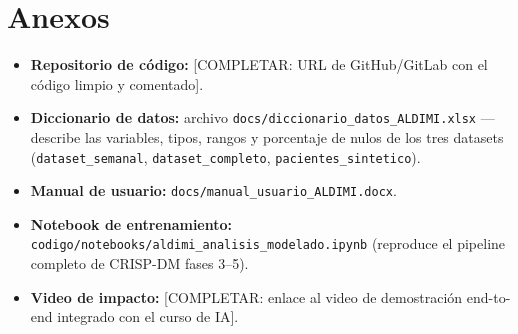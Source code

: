 \section*{Anexos}

\begin{itemize}[leftmargin=1.6em]
  \item \textbf{Repositorio de código:}
        [COMPLETAR: URL de GitHub/GitLab con el código limpio y comentado].
  \item \textbf{Diccionario de datos:} archivo
        \texttt{docs/diccionario\_datos\_ALDIMI.xlsx} --- describe las
        variables, tipos, rangos y porcentaje de nulos de los tres datasets
        (\texttt{dataset\_semanal}, \texttt{dataset\_completo},
        \texttt{pacientes\_sintetico}).
  \item \textbf{Manual de usuario:}
        \texttt{docs/manual\_usuario\_ALDIMI.docx}.
  \item \textbf{Notebook de entrenamiento:}
        \texttt{codigo/notebooks/aldimi\_analisis\_modelado.ipynb}
        (reproduce el pipeline completo de CRISP-DM fases 3--5).
  \item \textbf{Video de impacto:} [COMPLETAR: enlace al video de
        demostración end-to-end integrado con el curso de IA].
\end{itemize}
